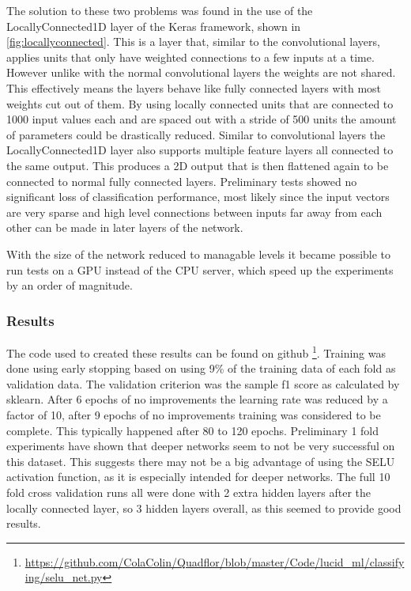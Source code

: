 \documentclass{article}
\begin{document}
The solution to these two problems was found in the use of the LocallyConnected1D layer of the Keras framework, shown in \ref{fig:locallyconnected}. This is a layer that, similar to the convolutional layers, applies 
units that only have weighted connections to a few inputs at a time. However unlike with the normal convolutional layers the weights are not shared. This effectively means the layers behave like fully 
connected layers with most weights cut out of them. By using locally connected units that are connected to 1000 input values each and are spaced out with a stride of 500 units the amount of parameters
could be drastically reduced. Similar to convolutional layers the LocallyConnected1D layer also supports multiple feature layers all connected to the same output.
This produces a 2D output that is then flattened again to be connected to normal fully connected layers.
Preliminary tests showed no significant loss of classification performance, most likely since the input vectors are very sparse and high level connections between inputs far away from each other can be made 
in later layers of the network.

With the size of the network reduced to managable levels it became possible to run tests on a GPU instead of the CPU server, which speed up the experiments by an order of magnitude.

\subsubsection*{Results}

The code used to created these results can be found on github \footnote{\url{https://github.com/ColaColin/Quadflor/blob/master/Code/lucid_ml/classifying/selu_net.py}}.
Training was done using early stopping based on using 9\% of the training data of each fold as validation data. The validation criterion was the sample f1 score as calculated by sklearn.
After 6 epochs of no improvements the learning rate was reduced by a factor of 10, after 9 epochs of no improvements training was considered to be complete. This typically happened after 80 to 120 
epochs. Preliminary 1 fold experiments have shown that deeper networks seem to not be very successful on this dataset. This suggests there may not be a 
big advantage of using the SELU activation function, as it is especially intended for deeper networks. The full 10 fold cross validation runs all were done
with 2 extra hidden layers after the locally connected layer, so 3 hidden layers overall, as this seemed to provide good results.
\end{document}
